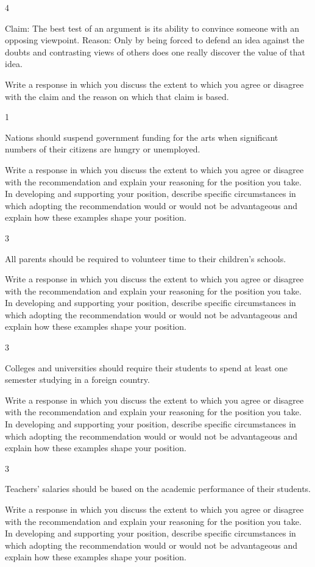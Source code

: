 \documentclass[]{article}
\begin{document}
4

Claim: The best test of an argument is its ability to convince someone
with an opposing viewpoint. Reason: Only by being forced to defend an
idea against the doubts and contrasting views of others does one really
discover the value of that idea.

Write a response in which you discuss the extent to which you agree or
disagree with the claim and the reason on which that claim is based.

1

Nations should suspend government funding for the arts when significant
numbers of their citizens are hungry or unemployed.

Write a response in which you discuss the extent to which you agree or
disagree with the recommendation and explain your reasoning for the
position you take. In developing and supporting your position, describe
specific circumstances in which adopting the recommendation would or
would not be advantageous and explain how these examples shape your
position.

3

All parents should be required to volunteer time to their children's
schools.

Write a response in which you discuss the extent to which you agree or
disagree with the recommendation and explain your reasoning for the
position you take. In developing and supporting your position, describe
specific circumstances in which adopting the recommendation would or
would not be advantageous and explain how these examples shape your
position.

3

Colleges and universities should require their students to spend at
least one semester studying in a foreign country.

Write a response in which you discuss the extent to which you agree or
disagree with the recommendation and explain your reasoning for the
position you take. In developing and supporting your position, describe
specific circumstances in which adopting the recommendation would or
would not be advantageous and explain how these examples shape your
position.

3

Teachers' salaries should be based on the academic performance of their
students.

Write a response in which you discuss the extent to which you agree or
disagree with the recommendation and explain your reasoning for the
position you take. In developing and supporting your position, describe
specific circumstances in which adopting the recommendation would or
would not be advantageous and explain how these examples shape your
position.
\end{document}
